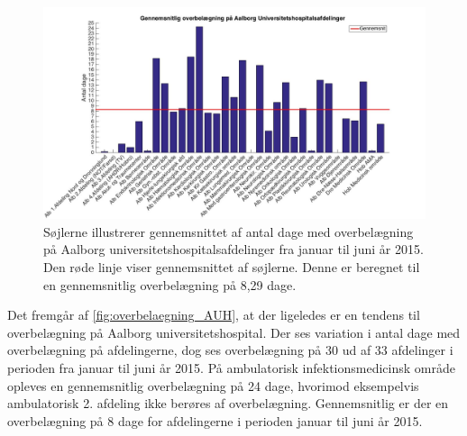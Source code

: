 \begin{figure}[H]
\centering
\includegraphics[width=1\textwidth]{figures/overbelaegning_AUH}
\caption{Søjlerne illustrerer gennemsnittet af antal dage med overbelægning på Aalborg universitetshospitalsafdelinger fra januar til juni år 2015. \cite{SDS2015} Den røde linje viser gennemsnittet af søjlerne. Denne er beregnet til en gennemsnitlig overbelægning på 8,29 dage.}
\label{fig:overbelaegning_AUH}
\end{figure}

\noindent
Det fremgår af \autoref{fig:overbelaegning_AUH}, at der ligeledes er en tendens til overbelægning på Aalborg universitetshospital. Der ses variation i antal dage med overbelægning på afdelingerne, dog ses overbelægning på 30 ud af 33 afdelinger i perioden fra januar til juni år 2015. På ambulatorisk infektionsmedicinsk område opleves en gennemsnitlig overbelægning på 24 dage, hvorimod eksempelvis ambulatorisk 2. afdeling ikke berøres af overbelægning. Gennemsnitlig er der en overbelægning på 8 dage for afdelingerne i perioden januar til juni år 2015.

